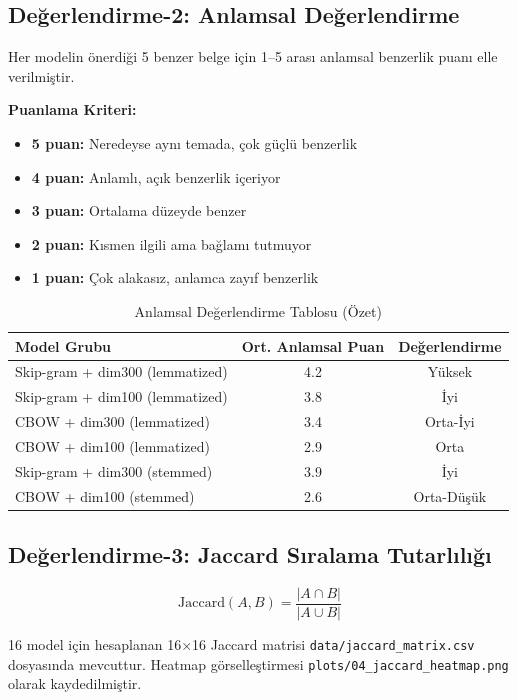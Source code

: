 \documentclass[12pt, a4paper]{article}
\begin{document}
\subsection{Değerlendirme-2: Anlamsal Değerlendirme}

Her modelin önerdiği 5 benzer belge için 1--5 arası anlamsal benzerlik puanı elle verilmiştir.

\textbf{Puanlama Kriteri:}
\begin{itemize}
    \item \textbf{5 puan:} Neredeyse aynı temada, çok güçlü benzerlik
    \item \textbf{4 puan:} Anlamlı, açık benzerlik içeriyor
    \item \textbf{3 puan:} Ortalama düzeyde benzer
    \item \textbf{2 puan:} Kısmen ilgili ama bağlamı tutmuyor
    \item \textbf{1 puan:} Çok alakasız, anlamca zayıf benzerlik
\end{itemize}

\begin{table}[H]
\centering
\caption{Anlamsal Değerlendirme Tablosu (Özet)}
\begin{tabular}{lcc}
\toprule
\textbf{Model Grubu} & \textbf{Ort. Anlamsal Puan} & \textbf{Değerlendirme} \\
\midrule
Skip-gram + dim300 (lemmatized) & 4.2 & {\color{green}Yüksek} \\
Skip-gram + dim100 (lemmatized) & 3.8 & {\color{green}İyi} \\
CBOW + dim300 (lemmatized)      & 3.4 & Orta-İyi \\
CBOW + dim100 (lemmatized)      & 2.9 & Orta \\
Skip-gram + dim300 (stemmed)    & 3.9 & {\color{green}İyi} \\
CBOW + dim100 (stemmed)         & 2.6 & Orta-Düşük \\
\bottomrule
\end{tabular}
\end{table}

\subsection{Değerlendirme-3: Jaccard Sıralama Tutarlılığı}

\[
\text{Jaccard}(A, B) = \frac{|A \cap B|}{|A \cup B|}
\]

16 model için hesaplanan 16$\times$16 Jaccard matrisi \texttt{data/jaccard\_matrix.csv} dosyasında mevcuttur. Heatmap görselleştirmesi \texttt{plots/04\_jaccard\_heatmap.png} olarak kaydedilmiştir.
\end{document}
